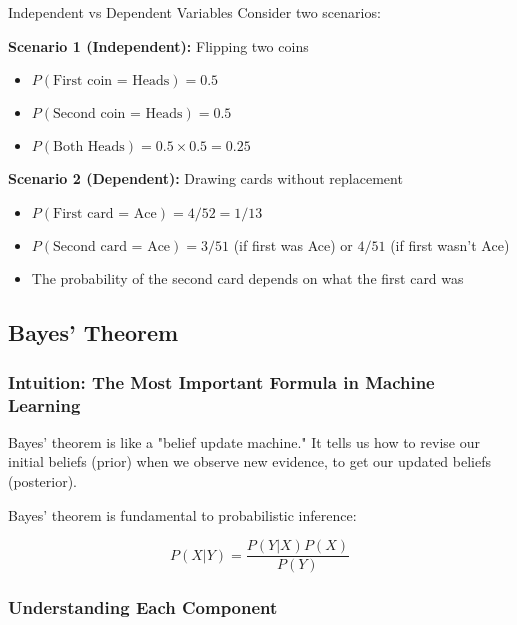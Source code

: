 \begin{examplebox}{Independent vs Dependent Variables}
Consider two scenarios:

\textbf{Scenario 1 (Independent):} Flipping two coins
\begin{itemize}
    \item $P(\text{First coin = Heads}) = 0.5$
    \item $P(\text{Second coin = Heads}) = 0.5$
    \item $P(\text{Both Heads}) = 0.5 \times 0.5 = 0.25$ \checkmark
\end{itemize}

\textbf{Scenario 2 (Dependent):} Drawing cards without replacement
\begin{itemize}
    \item $P(\text{First card = Ace}) = 4/52 = 1/13$
    \item $P(\text{Second card = Ace}) = 3/51$ (if first was Ace) or $4/51$ (if first wasn't Ace)
    \item The probability of the second card depends on what the first card was
\end{itemize}
\end{examplebox}

\subsection{Bayes' Theorem}

\subsubsection{Intuition: The Most Important Formula in Machine Learning}

Bayes' theorem is like a "belief update machine." It tells us how to revise our initial beliefs (prior) when we observe new evidence, to get our updated beliefs (posterior).

\begin{theorem}
Bayes' theorem is fundamental to probabilistic inference:

\begin{equation}
P(X|Y) = \frac{P(Y|X)P(X)}{P(Y)}
\end{equation}
\end{theorem}

\subsubsection{Understanding Each Component}

